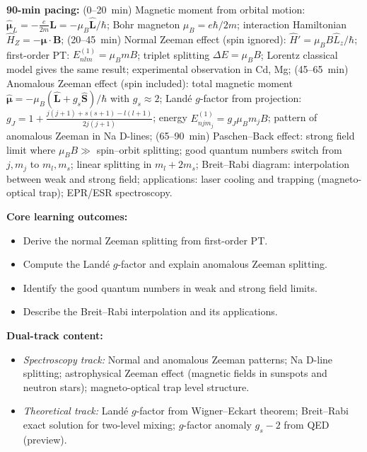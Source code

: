 \documentclass[11pt,a4paper]{article}
\begin{document}
\begin{tcolorbox}[modulebox, title={Module~I.4 / L06: Zeeman Effect}]
\textbf{90-min pacing:} (0--20~min) Magnetic moment from orbital motion:
$\hat{\boldsymbol\mu}_L=-\tfrac{e}{2m}\hat{\mathbf{L}}=-\mu_B\hat{\mathbf{L}}/\hbar$;
Bohr magneton $\mu_B=e\hbar/2m$;
interaction Hamiltonian $\hat{H}_Z=-\hat{\boldsymbol\mu}\cdot\mathbf{B}$;
(20--45~min) Normal Zeeman effect (spin ignored): $\hat{H}'=\mu_B B\hat{L}_z/\hbar$;
first-order PT: $E^{(1)}_{nlm}=\mu_B m B$; triplet splitting $\Delta E=\mu_B B$;
Lorentz classical model gives the same result; experimental observation in Cd, Mg;
(45--65~min) Anomalous Zeeman effect (spin included):
total magnetic moment $\hat{\boldsymbol\mu}=-\mu_B(\hat{\mathbf{L}}+g_s\hat{\mathbf{S}})/\hbar$ with $g_s\approx2$;
Land\'e $g$-factor from projection: $g_J=1+\tfrac{j(j+1)+s(s+1)-l(l+1)}{2j(j+1)}$;
energy $E^{(1)}_{njm_j}=g_J\mu_B m_j B$; pattern of anomalous Zeeman in Na D-lines;
(65--90~min) Paschen--Back effect: strong field limit where $\mu_B B\gg$ spin--orbit splitting;
good quantum numbers switch from $j,m_j$ to $m_l,m_s$; linear splitting in $m_l+2m_s$;
Breit--Rabi diagram: interpolation between weak and strong field;
applications: laser cooling and trapping (magneto-optical trap); EPR/ESR spectroscopy.

\medskip\textbf{Core learning outcomes:}
\begin{itemize}[leftmargin=1.4em,topsep=2pt,itemsep=1pt]
  \item Derive the normal Zeeman splitting from first-order PT.
  \item Compute the Land\'e $g$-factor and explain anomalous Zeeman splitting.
  \item Identify the good quantum numbers in weak and strong field limits.
  \item Describe the Breit--Rabi interpolation and its applications.
\end{itemize}

\medskip\textbf{Dual-track content:}
\begin{itemize}[leftmargin=1.4em,topsep=2pt,itemsep=1pt]
  \item \textit{Spectroscopy track:} Normal and anomalous Zeeman patterns; Na D-line splitting;
    astrophysical Zeeman effect (magnetic fields in sunspots and neutron stars);
    magneto-optical trap level structure.
  \item \textit{Theoretical track:} Land\'e $g$-factor from Wigner--Eckart theorem; Breit--Rabi exact solution
    for two-level mixing; $g$-factor anomaly $g_s-2$ from QED (preview).
\end{itemize}


\end{tcolorbox}
\end{document}
